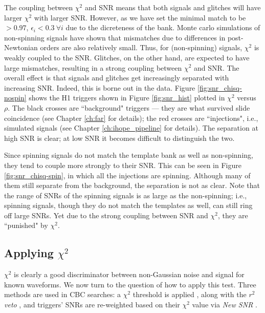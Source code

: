 The coupling between $\chi^2$ and \ac{SNR} means that both signals and glitches will have larger $\chi^2$ with larger \ac{SNR}. However, as we have set the minimal match to be $> 0.97$, $\epsilon_i < 0.3~\forall i$ due to the dicreteness of the bank. Monte carlo simulations of non-spinning signals have shown that mismatches due to differences in post-Newtonian orders are also relatively small. Thus, for (non-spinning) signals, $\chi^2$ is weakly coupled to the \ac{SNR}. Glitches, on the other hand, are expected to have large mismatches, resulting in a strong coupling between $\chi^2$ and \ac{SNR}. The overall effect is that signals and glitches get increasingly separated with increasing \ac{SNR}. Indeed, this is borne out in the data. Figure \ref{fig:snr_chisq-nospin} shows the H1 triggers shown in Figure \ref{fig:snr_hist} plotted in $\chi^2$ versus $\rho$. The black crosses are ``background" triggers --- they are what survived slide coincidence (see Chapter \ref{ch:far} for details); the red crosses are ``injections", i.e., simulated signals (see Chapter \ref{ch:ihope_pipeline} for details). The separation at high \ac{SNR} is clear; at low \ac{SNR} it becomes difficult to distinguish the two.

Since spinning signals do not match the template bank as well as non-spinning, they tend to couple more strongly to their \ac{SNR}. This can be seen in Figure \ref{fig:snr_chisq-spin}, in which all the injections are spinning. Although many of them still separate from the background, the separation is not as clear. Note that the range of \acp{SNR} of the spinning signals is as large as the non-spinning; i.e., spinning signals, though they do not match the templates as well, can still ring off large \acp{SNR}. Yet due to the strong coupling between \ac{SNR} and $\chi^2$, they are ``punished" by $\chi^2$. 

\subsection{Applying $\chi^2$}

$\chi^2$ is clearly a good discriminator between non-Gaussian noise and signal for known waveforms. We now turn to the question of how to apply this test. Three methods are used in \ac{CBC} searches: a $\chi^2$ threshold is applied \cite{Brown}, along with the \emph{$r^2$ veto} \cite{Rodriguez:2007, Keppel:thesis}, and triggers' \acp{SNR} are re-weighted based on their $\chi^2$ value via \emph{New SNR} \cite{Collaboration:S6CBClowmass}.

